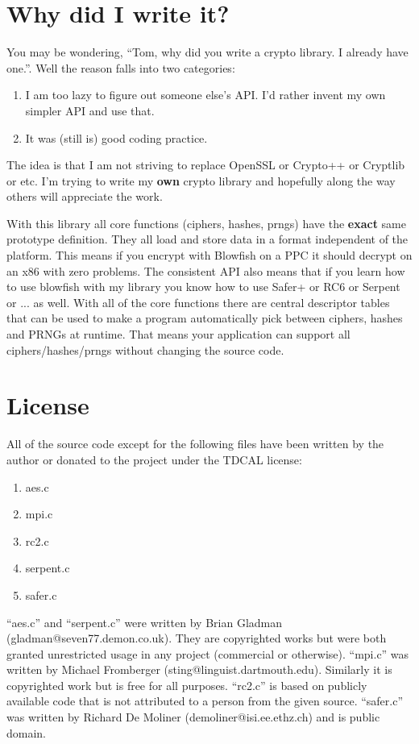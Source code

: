 \documentclass{book}
\begin{document}
\section{Why did I write it?}
You may be wondering, ``Tom, why did you write a crypto library.  I already have one.''.  Well the reason falls into
two categories:
\begin{enumerate}
    \item I am too lazy to figure out someone else's API.  I'd rather invent my own simpler API and use that.
    \item It was (still is) good coding practice.
\end{enumerate}

The idea is that I am not striving to replace OpenSSL or Crypto++ or Cryptlib or etc.  I'm trying to write my 
{\bf own} crypto library and hopefully along the way others will appreciate the work.

With this library all core functions (ciphers, hashes, prngs) have the {\bf exact} same prototype definition.  They all load
and store data in a format independent of the platform.  This means if you encrypt with Blowfish on a PPC it should decrypt
on an x86 with zero problems.  The consistent API also means that if you learn how to use blowfish with my library you 
know how to use Safer+ or RC6 or Serpent or ... as well.  With all of the core functions there are central descriptor tables 
that can be used to make a program automatically pick between ciphers, hashes and PRNGs at runtime.  That means your 
application can support all ciphers/hashes/prngs without changing the source code.

\section{License}

All of the source code except for the following files have been written by the author or donated to the project
under the TDCAL license:

\begin{enumerate}
   \item aes.c
   \item mpi.c
   \item rc2.c
   \item serpent.c
   \item safer.c
\end{enumerate}

``aes.c'' and ``serpent.c'' were written by Brian Gladman (gladman@seven77.demon.co.uk).  They are copyrighted works
but were both granted unrestricted usage in any project (commercial or otherwise).  ``mpi.c'' was written by Michael 
Fromberger (sting@linguist.dartmouth.edu).  Similarly it is copyrighted work but is free for all purposes.  
``rc2.c'' is based on publicly available code that is not attributed to a person from the given source.  ``safer.c'' 
was written by Richard De Moliner (demoliner@isi.ee.ethz.ch) and is public domain.
\end{document}
